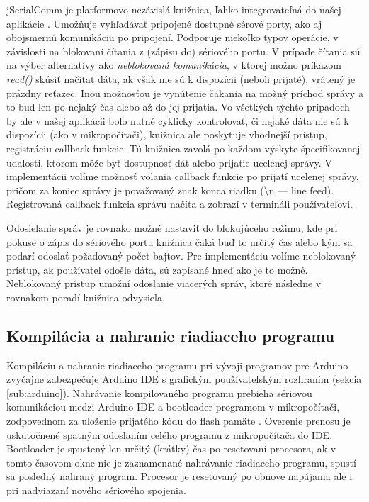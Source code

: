 jSerialComm je platformovo nezávislá knižnica, ľahko integrovateľná do našej aplikácie \cite{jSerialComm}. Umožňuje vyhľadávať pripojené dostupné sérové porty, ako aj obojsmernú komunikáciu po pripojení. Podporuje niekoľko typov operácie, v závislosti na blokovaní čítania z (zápisu do) sériového portu. V prípade čítania sú na výber alternatívy ako \textit{neblokovaná komunikácia}, v ktorej možno príkazom \textit{read()} skúsiť načítať dáta, ak však nie sú k dispozícii (neboli prijaté), vrátený je prázdny reťazec. Inou možnosťou je vynútenie čakania na možný príchod správy a to buď len po nejaký čas alebo až do jej prijatia. Vo všetkých týchto prípadoch by ale v našej aplikácii bolo nutné cyklicky kontrolovať, či nejaké dáta nie sú k dispozícii (ako v mikropočítači), knižnica ale poskytuje vhodnejší prístup, registráciu callback funkcie. Tú knižnica zavolá po každom výskyte špecifikovanej udalosti, ktorom môže byť dostupnosť dát alebo prijatie ucelenej správy. V implementácii volíme možnosť volania callback funkcie po prijatí ucelenej správy, pričom za koniec správy je považovaný znak konca riadku (\textbackslash n --- line feed). Registrovaná callback funkcia správu načíta a zobrazí v termináli používateľovi.

Odosielanie správ je rovnako možné nastaviť do blokujúceho režimu, kde pri pokuse o zápis do sériového portu knižnica čaká buď to určitý čas alebo kým sa podarí odoslať požadovaný počet bajtov. Pre implementáciu volíme neblokovaný prístup, ak používateľ odošle dáta, sú zapísané hneď ako je to možné. Neblokovaný prístup umožní odoslanie viacerých správ, ktoré následne v rovnakom poradí knižnica odvysiela.


\subsection{Kompilácia a nahranie riadiaceho programu}
\label{sub:arduinoIDE}
Kompiláciu a nahranie riadiaceho programu pri vývoji programov pre Arduino zvyčajne zabezpečuje Arduino IDE s grafickým používateľským rozhraním (sekcia \ref{sub:arduino}). Nahrávanie kompilovaného programu prebieha sériovou komunikáciou medzi Arduino IDE a bootloader programom v mikropočítači, zodpovednom za uloženie prijatého kódu do flash pamäte \cite{sketchUpload}. Overenie prenosu je uskutočnené spätným odoslaním celého programu z mikropočítača do IDE. Bootloader je spustený len určitý (krátky) čas po resetovaní procesora, ak v tomto časovom okne nie je zaznamenané nahrávanie riadiaceho programu, spustí sa posledný nahraný program. Procesor je resetovaný po obnove napájania ale i pri nadviazaní nového sériového spojenia.

